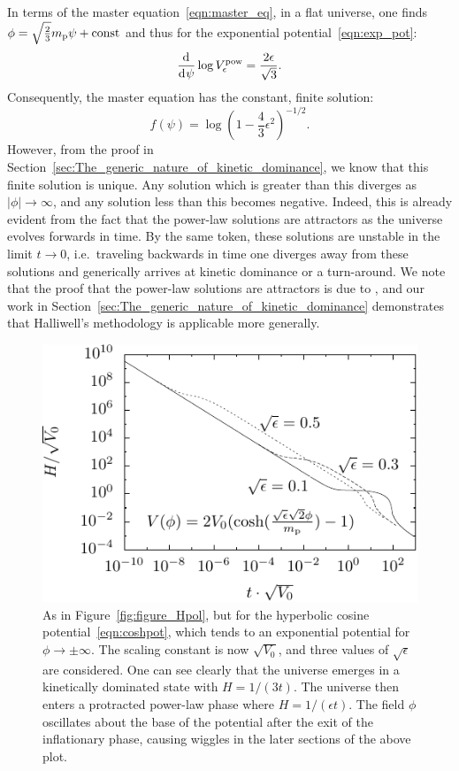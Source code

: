 In terms of the master equation~\eqref{eqn:master_eq}, in a flat universe, one finds \(\phi = \sqrt{\frac{2}{3}}m_{\mathrm{p}} \psi + \mathrm{const} \) and thus for the exponential potential~\eqref{eqn:exp_pot}:
%
\begin{equation}
  \frac{\operatorname{d}^{}\!{}}{\operatorname{d}^{}\!{\psi}} \log V^\mathrm{pow}_\epsilon = \frac{2\epsilon}{\sqrt{3}}. 
\end{equation}
%
Consequently, the master equation has the constant, finite solution:
%
\begin{equation}
  f(\psi) = \log{\left(1-\frac{4}{3}\epsilon^2\right)}^{-1/2}.
  \label{eqn:uf_power_law}
\end{equation}
%
However, from the proof in Section~\ref{sec:The_generic_nature_of_kinetic_dominance}, we know that this finite solution is unique. Any solution which is greater than this diverges as \(|\phi|\to\infty\), and any solution less than this becomes negative.  Indeed, this is already evident from the fact that the power-law solutions are attractors as the universe evolves forwards in time. By the same token, these solutions are unstable in the limit \(t \to 0\), i.e.\ traveling backwards in time one diverges away from these solutions and generically arrives at kinetic dominance or a turn-around.  We note that the proof that the power-law solutions are attractors is due to \citet{halliwell_scalar_1987}, and our work in Section~\ref{sec:The_generic_nature_of_kinetic_dominance} demonstrates that Halliwell's methodology is applicable more generally.

%
\begin{figure}[tp]
  \includegraphics[width=\textwidth]{chapters/kinetic_dominance/figures/Hlam}
  \caption{As in Figure~\protect\ref{fig:figure_Hpol}, but for the hyperbolic cosine potential~\protect\eqref{eqn:coshpot}, which tends to an exponential potential for \(\phi \to \pm\infty\). The scaling constant is now \(\sqrt{V_0}\), and three values of \(\sqrt{\epsilon}\) are considered. One can see clearly that the universe emerges in a kinetically dominated state with \(H=1/(3t)\). The universe then enters a protracted power-law phase where \(H = 1/(\epsilon t)\). The field \(\phi\) oscillates about the base of the potential after the exit of the inflationary phase, causing wiggles in the later sections of the above plot.\label{fig:figure_Hlam}}
\end{figure}
%

